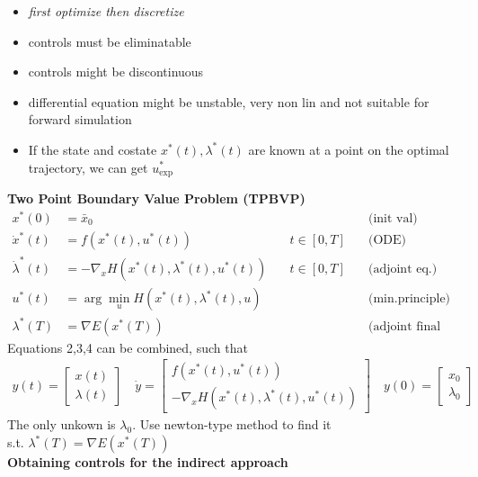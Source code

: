 
\begin{tcolorbox}[colback=gray!5!white,colframe=gray!75!black,title=\textbf{Indirect Approach}]
\begin{itemize}
	\item \textit{first optimize then discretize}
	\item controls must be eliminatable
	\item controls might be discontinuous
	\item differential equation might be unstable, very non lin and not suitable
    for forward simulation
  \item If the state and costate $x^*(t),\lambda^*(t)$ are known at a point on
    the optimal trajectory, we can get $u^*_{\mathrm{exp}}$ \\
\end{itemize}
\textbf{Two Point Boundary Value Problem (TPBVP)}
\begin{align*}
	x^*(0) &= \bar{x}_0 & & \text{(init val)}\\
	\dot{x}^*(t) &= f(x^*(t), u^*(t)) \quad &t \in [0, T] \quad & \text{(ODE)}\\
	\dot{\lambda}^*(t) &= - \nabla_x H(x^*(t), \lambda^*(t), u^*(t)) \quad & t \in [0, T] \quad & \text{(adjoint eq.)}\\
	u^*(t) &= \arg \min_u H(x^*(t), \lambda^*(t), u) & & \text{(min.principle)}\\
	\lambda^*(T) &= \nabla E(x^*(T)) & & \text{(adjoint final val)}
\end{align*}
Equations 2,3,4 can be combined, such that
\begin{align*}
	y(t) = \begin{bmatrix}
	x(t) \\ \lambda(t)
	\end{bmatrix}
	 \quad
	 \dot{y} =
	 \begin{bmatrix}
		 f(x^*(t), u^*(t))\\
		 - \nabla_x H(x^*(t), \lambda^*(t), u^*(t))
	 \end{bmatrix}
 	\quad
 	y(0) = \begin{bmatrix}
		x_0\\ \lambda_0
 	\end{bmatrix}
\end{align*}
The only unkown is $\lambda_0$. Use newton-type method to find it\\s.t.
$\lambda^*(T) = \nabla E(x^*(T)) $\\
\textbf{Obtaining controls for the indirect approach}\\

\end{tcolorbox}
